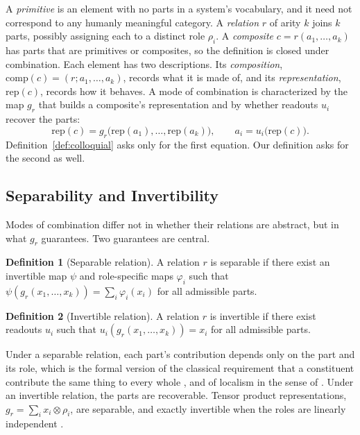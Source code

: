 \documentclass{article}
\theoremstyle{definition}
\newtheorem{definition}{Definition}
\theoremstyle{plain}
\theoremstyle{remark}
\newcommand{\comp}{\mathrm{comp}}
\newcommand{\rep}{\mathrm{rep}}
\begin{document}
A {\it primitive\/} is an element with no parts in a system's
vocabulary, and it need not correspond to any humanly meaningful
category. A {\it relation\/} $r$ of arity $k$ joins $k$ parts, possibly
assigning each to a distinct role $\rho_i$. A {\it composite\/} $c =
r(a_1, \ldots, a_k)$ has parts that are primitives or composites, so
the definition is closed under combination. Each element has two
descriptions. Its {\it composition\/}, $\comp(c) = (r; a_1, \ldots,
a_k)$, records what it is made of, and its {\it representation\/},
$\rep(c)$, records how it behaves. A mode of combination is
characterized by the map $g_r$ that builds a composite's representation
and by whether readouts $u_i$ recover the parts:
\begin{equation}
  \rep(c) = g_r\big(\rep(a_1), \ldots, \rep(a_k)\big), \qquad a_i = u_i\big(\rep(c)\big).
  \label{eq:binding}
\end{equation}
Definition~\ref{def:colloquial} asks only for the first equation. Our
definition asks for the second as well.

\subsection{Separability and Invertibility}

Modes of combination differ not in whether their relations are
abstract, but in what $g_r$ guarantees. Two guarantees are central.

\begin{definition}[Separable relation]
A relation $r$ is separable if there exist an invertible map $\psi$
and role-specific maps $\varphi_i$ such that $\psi(g_r(x_1, \ldots,
x_k)) = \sum_i \varphi_i(x_i)$ for all admissible parts.
\end{definition}

\begin{definition}[Invertible relation]
A relation $r$ is invertible if there exist readouts $u_i$ such that
$u_i(g_r(x_1, \ldots, x_k)) = x_i$ for all admissible parts.
\end{definition}

\noindent
Under a separable relation, each part's contribution depends only on
the part and its role, which is the formal version of the classical
requirement that a constituent contribute the same thing to every
whole \citep{fodor1988}, and of localism in the sense of
\citet{hupkes2020}. Under an invertible relation, the parts are
recoverable. Tensor product representations, $g_r = \sum_i x_i \otimes
\rho_i$, are separable, and exactly invertible when the roles are
linearly independent \citep{smolensky1990}.
\end{document}
